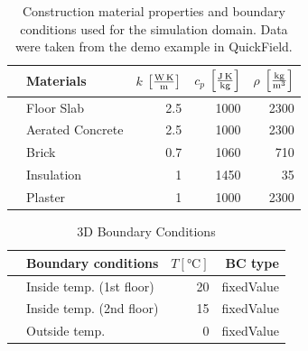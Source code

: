 \begin{table}[tbh]
    \centering
    \label{tab:construction_material_properties}
    \caption[3D Material Properties]{Construction material properties and boundary conditions used for the simulation domain. Data were taken from the demo example in QuickField.}
      \centering
        \begin{tabular}{clrrr}    
            \toprule   
            & Materials       & $k$ $\left[ \si[per-mode=fraction]{\watt\per\metre\kelvin} \right]$ & $c_p$   $\left[ \si[per-mode=fraction]{\joule\per\kilogram\kelvin}\right]$ & $\rho$  $\left[ \si[per-mode=fraction]{\kilogram\per\cubic\metre} \right]$   \\
            \midrule
            & Floor Slab        & 2.5                        & 1000                      & 2300               \\
            & Aerated Concrete  & 2.5                        & 1000                      & 2300               \\
            & Brick             & 0.7                        & 1060                       & 710               \\
            & Insulation        & 1                         & 1450                      & 35               \\
            & Plaster           & 1                         & 1000                      & 2300              \\
            \bottomrule
        \end{tabular}
  
\end{table}


    \begin{table}[tbh]
   
      \caption{3D Boundary Conditions}
      \centering
        \begin{tabular}{llrr}    
            \toprule   
            & Boundary conditions          & $T [\si{\degreeCelsius}]$           & BC type                   \\ 
            \midrule
            & Inside temp.  (1st floor)         & 20                          & fixedValue                \\
            & Inside temp.  (2nd floor)          & 15                          & fixedValue                \\
            & Outside temp.  & 0                          & fixedValue                \\ 
            \bottomrule
        \end{tabular}

\end{table}






